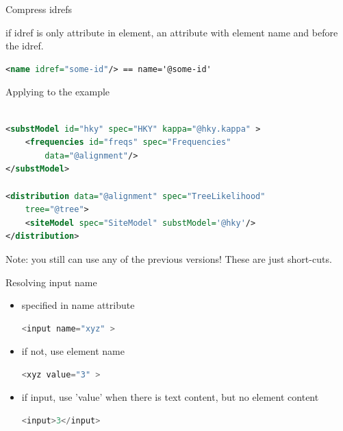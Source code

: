 \documentclass{beamer}
\theoremstyle{definition}
\begin{document}
\begin{frame}[containsverbatim]{Compress idrefs}

if idref is only attribute in element, an attribute with element
name and \@ before the idref.

\begin{lstlisting}[language=XML]
<name idref="some-id"/> == name='@some-id'
\end{lstlisting}

Applying to the example

{\small
\begin{lstlisting}[language=XML]

<substModel id="hky" spec="HKY" kappa="@hky.kappa" >
    <frequencies id="freqs" spec="Frequencies" 
        data="@alignment"/>
</substModel>

<distribution data="@alignment" spec="TreeLikelihood" 
    tree="@tree">
    <siteModel spec="SiteModel" substModel='@hky'/>
</distribution>
\end{lstlisting}
}
Note: you still can use any of the previous versions! These are just short-cuts.
\end{frame}




\begin{frame}[containsverbatim]
{Resolving input name}

\begin{itemize}
\item specified in name attribute
\begin{lstlisting}[language=java]
    <input name="xyz" >
\end{lstlisting}
\item if not, use element name
\begin{lstlisting}[language=java]
    <xyz value="3" >
\end{lstlisting}
\item if input, use 'value' when there is text content, but no element content
\begin{lstlisting}[language=java]
    <input>3</input>
\end{lstlisting}
\end{itemize}
\end{frame}
\end{document}
